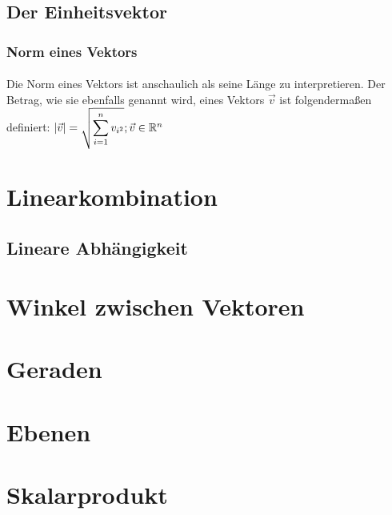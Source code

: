 \subsection{Der Einheitsvektor}

\subsubsection{Norm eines Vektors}

\paragraph{} Die Norm eines Vektors ist anschaulich als seine Länge zu interpretieren. Der Betrag, wie sie ebenfalls genannt wird, eines Vektors $\vec{v}$ ist folgendermaßen definiert: $\text{|}\vec{v}\text{|} = \sqrt{\displaystyle\sum_{i=1}^{n}v_{i^2}} ; \vec{v}\in\R^n$
\begin{tikzpicture}
\end{tikzpicture}


\paragraph{}


\section{Linearkombination}
\subsection{Lineare Abhängigkeit}
\section{Winkel zwischen Vektoren}
\section{Geraden}
\section{Ebenen}
\section{Skalarprodukt}
